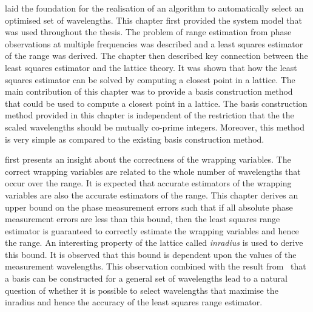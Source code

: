  laid the foundation for the realisation of an algorithm to automatically select an optimised set of wavelengths. This chapter first provided the system model that was used throughout the thesis. The problem of range estimation from phase observations at multiple frequencies was described and a least squares estimator of the range was derived. The chapter then described key connection between the least squares estimator and the lattice theory. It was shown that how the least squares estimator can be solved by computing a closest point in a lattice. The main contribution of this chapter was to provide a basis construction method that could be used to compute a closest point in a lattice. The basis construction method provided in this chapter is independent of the restriction that the the scaled wavelengths should be mutually co-prime integers. Moreover, this method is very simple as compared to the existing basis construction method. 

 first presents an insight about the correctness of the wrapping variables. The correct wrapping variables are related to the whole number of wavelengths that occur over the range. It is expected that accurate estimators of the wrapping variables are also the accurate estimators of the range. This chapter derives an upper bound on the phase measurement errors such that if all absolute phase measurement errors are less than this bound, then the least squares range estimator is guaranteed to correctly estimate the wrapping variables and hence the range. An interesting property of the lattice called \emph{inradius} is used to derive this bound. It is observed that this bound is dependent upon the values of the measurement wavelengths. This observation combined with the result from~ that a basis can be constructed for a general set of wavelengths lead to a natural question of whether it is possible to select wavelengths that maximise the inradius and hence the accuracy of the least squares range estimator.

